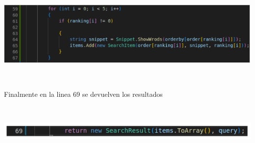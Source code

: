 \documentclass{article}
\begin{document}
{\

\centering
\includegraphics[height = 2.9 cm ]{Captura desde 2023-07-19 12-13-44.png}

\

Finalmente en la linea 69 se devuelven los resultados 

\

\centering
\includegraphics[height = 0.8 cm ]{Captura desde 2023-07-19 12-17-54.png}

}
\end{document}
